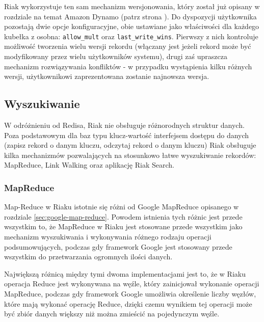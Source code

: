 Riak wykorzystuje ten sam mechanizm wersjonowania, który został już opisany w rozdziale na temat Amazon Dynamo (patrz strona \pageref{sec:dynamo-vector-clocks}).
Do dyspozycji użytkownika pozostają dwie opcje konfiguracyjne, obie ustawiane jako właściwości dla każdego kubełka z osobna: \verb+allow_mult+ oraz \verb+last_write_wins+.
Pierwszy z nich kontroluje możliwość tworzenia wielu wersji rekordu (włączany jest jeżeli rekord może być modyfikowany przez wielu użytkowników systemu), drugi zaś upraszcza mechanizm rozwiązywania konfliktów - w przypadku wystąpienia kilku różnych wersji, użytkownikowi zaprezentowana zostanie najnowsza wersja.

\subsection*{Wyszukiwanie}

W odróżnieniu od Redisa, Riak nie obsługuje różnorodnych struktur danych.
Poza podstawowym dla baz typu klucz-wartość interfejsem dostępu do danych (zapisz rekord o danym kluczu, odczytaj rekord o danym kluczu) Riak obsługuje kilka mechanizmów pozwalających na stosunkowo łatwe wyszukiwanie rekordów: MapReduce, Link Walking oraz aplikację Riak Search.

\subsubsection*{MapReduce}

Map-Reduce w Riaku istotnie się różni od Google MapReduce opisanego w rozdziale \ref{sec:google-map-reduce}.
Powodem istnienia tych różnic jest przede wszystkim to, że MapReduce w Riaku jest stosowane przede wszystkim jako mechanizm wyszukiwania i wykonywania różnego rodzaju operacji podsumowujących, podczas gdy framework Google jest stosowany przede wszystkim do przetwarzania ogromnych ilości danych.

Największą różnicą między tymi dwoma implementacjami jest to, że w Riaku operacja Reduce jest wykonywana na węźle, który zainicjował wykonanie operacji MapReduce, podczas gdy framework Google umożliwia określenie liczby węzłów, które mają wykonać operację Reduce, dzięki czemu wynikiem tej operacji może być zbiór danych większy niż można zmieścić na pojedynczym węźle.

